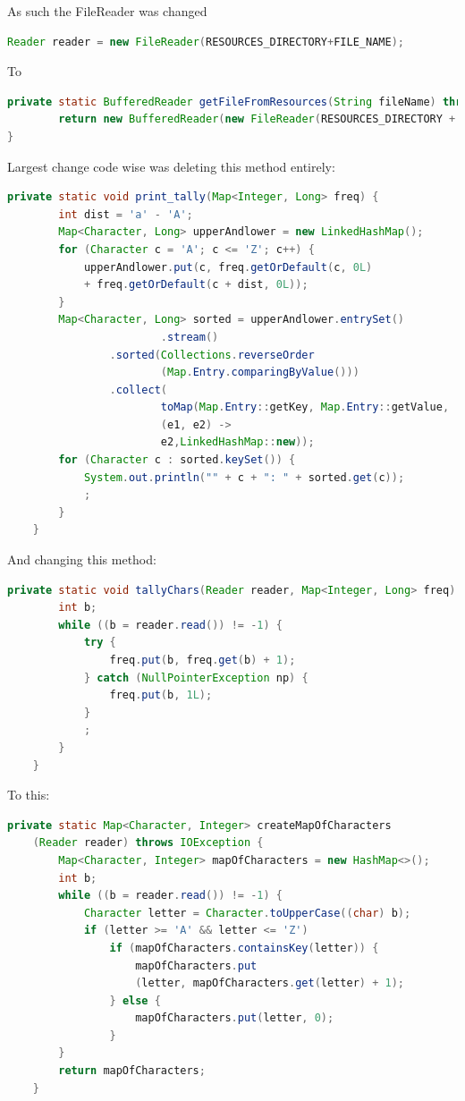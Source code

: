 \documentclass[a4paper, 12pt]{report}
\begin{document}
As such the FileReader was changed

\begin{lstlisting}[language=java]
Reader reader = new FileReader(RESOURCES_DIRECTORY+FILE_NAME);
\end{lstlisting}

To

\begin{lstlisting}[language=java]
private static BufferedReader getFileFromResources(String fileName) throws FileNotFoundException {
		return new BufferedReader(new FileReader(RESOURCES_DIRECTORY + fileName));
}
\end{lstlisting}

Largest change code wise was deleting this method entirely:

\begin{lstlisting}[language=java]
private static void print_tally(Map<Integer, Long> freq) {
        int dist = 'a' - 'A';
        Map<Character, Long> upperAndlower = new LinkedHashMap();
        for (Character c = 'A'; c <= 'Z'; c++) {
            upperAndlower.put(c, freq.getOrDefault(c, 0L) 
            + freq.getOrDefault(c + dist, 0L));
        }
        Map<Character, Long> sorted = upperAndlower.entrySet()
        				.stream()
                .sorted(Collections.reverseOrder
                		(Map.Entry.comparingByValue()))
                .collect(
                		toMap(Map.Entry::getKey, Map.Entry::getValue, 
                		(e1, e2) -> 
                		e2,LinkedHashMap::new));
        for (Character c : sorted.keySet()) {
            System.out.println("" + c + ": " + sorted.get(c));
            ;
        }
    }
\end{lstlisting}
\newpage
And changing this method:

\begin{lstlisting}[language=java]
 private static void tallyChars(Reader reader, Map<Integer, Long> freq) throws IOException {
        int b;
        while ((b = reader.read()) != -1) {
            try {
                freq.put(b, freq.get(b) + 1);
            } catch (NullPointerException np) {
                freq.put(b, 1L);
            }
            ;
        }
    }

\end{lstlisting}

To this:
\begin{lstlisting}[language=java]
    private static Map<Character, Integer> createMapOfCharacters
    (Reader reader) throws IOException {
        Map<Character, Integer> mapOfCharacters = new HashMap<>();
        int b;
        while ((b = reader.read()) != -1) {
            Character letter = Character.toUpperCase((char) b);
            if (letter >= 'A' && letter <= 'Z')
                if (mapOfCharacters.containsKey(letter)) {
                    mapOfCharacters.put
                    (letter, mapOfCharacters.get(letter) + 1);
                } else {
                    mapOfCharacters.put(letter, 0);
                }
        }
        return mapOfCharacters;
    }
\end{lstlisting}
\end{document}
